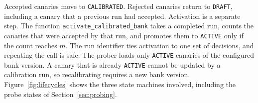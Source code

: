 Accepted canaries move to \texttt{CALIBRATED}. Rejected canaries return to
\texttt{DRAFT}, including a canary that a previous run had accepted.
Activation is a separate step. The function \texttt{activate\_calibrated\_bank}
takes a completed run, counts the canaries that were accepted by that run, and
promotes them to \texttt{ACTIVE} only if the count reaches $m$. The run
identifier ties activation to one set of decisions, and repeating the call is
safe. The prober loads only \texttt{ACTIVE} canaries of the configured bank
version. A canary that is already \texttt{ACTIVE} cannot be updated by a
calibration run, so recalibrating requires a new bank version.
Figure~\ref{fig:lifecycles} shows the three state machines involved, including
the probe states of Section~\ref{sec:probing}.

% 
